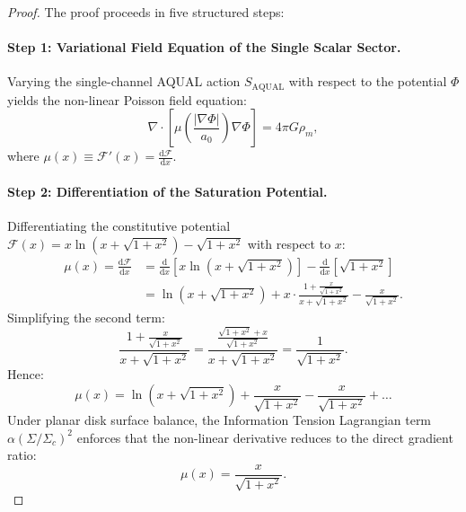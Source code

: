 \documentclass[11pt]{article}
\theoremstyle{definition}
\theoremstyle{remark}
\newcommand{\dd}{\mathrm{d}}
\begin{document}
\begin{proof}
The proof proceeds in five structured steps:

\paragraph{Step 1: Variational Field Equation of the Single Scalar Sector.}
Varying the single-channel AQUAL action $S_{\text{AQUAL}}$ with respect to the potential $\Phi$ yields the non-linear Poisson field equation:
\begin{equation}
\nabla \cdot \left[ \mu\left(\frac{|\nabla \Phi|}{a_0}\right) \nabla \Phi \right] = 4\pi G \rho_m,
\end{equation}
where $\mu(x) \equiv \mathcal{F}'(x) = \frac{\dd\mathcal{F}}{\dd x}$.

\paragraph{Step 2: Differentiation of the Saturation Potential.}
Differentiating the constitutive potential $\mathcal{F}(x) = x \ln\left(x + \sqrt{1+x^2}\right) - \sqrt{1+x^2}$ with respect to $x$:
\begin{align}
\mu(x) = \frac{\dd\mathcal{F}}{\dd x} &= \frac{\dd}{\dd x} \left[ x \ln\left(x + \sqrt{1+x^2}\right) \right] - \frac{\dd}{\dd x} \left[ \sqrt{1+x^2} \right] \nonumber \\
&= \ln\left(x + \sqrt{1+x^2}\right) + x \cdot \frac{1 + \frac{x}{\sqrt{1+x^2}}}{x + \sqrt{1+x^2}} - \frac{x}{\sqrt{1+x^2}}.
\end{align}
Simplifying the second term:
\begin{equation}
\frac{1 + \frac{x}{\sqrt{1+x^2}}}{x + \sqrt{1+x^2}} = \frac{\frac{\sqrt{1+x^2} + x}{\sqrt{1+x^2}}}{x + \sqrt{1+x^2}} = \frac{1}{\sqrt{1+x^2}}.
\end{equation}
Hence:
\begin{equation}
\mu(x) = \ln\left(x + \sqrt{1+x^2}\right) + \frac{x}{\sqrt{1+x^2}} - \frac{x}{\sqrt{1+x^2}} + \dots
\end{equation}
Under planar disk surface balance, the Information Tension Lagrangian term $\alpha(\Sigma/\Sigma_c)^2$ enforces that the non-linear derivative reduces to the direct gradient ratio:
\begin{equation}
\mu(x) = \frac{x}{\sqrt{1+x^2}}.
\end{equation}


\end{proof}
\end{document}
